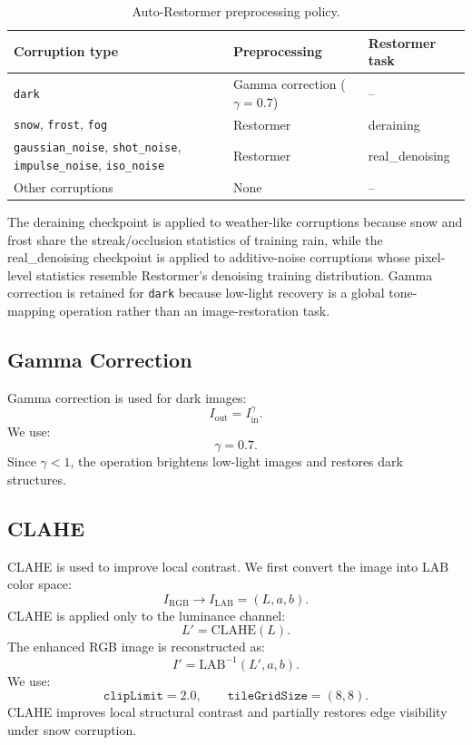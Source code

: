 \documentclass[10pt]{article}
\begin{document}
\begin{table}[H]
\centering
\begin{tabular}{lll}
\toprule
Corruption type & Preprocessing & Restormer task \\
\midrule
\texttt{dark} & Gamma correction ($\gamma=0.7$) & -- \\
\texttt{snow}, \texttt{frost}, \texttt{fog} & Restormer & deraining \\
\texttt{gaussian\_noise}, \texttt{shot\_noise}, \texttt{impulse\_noise}, \texttt{iso\_noise} & Restormer & real\_denoising \\
Other corruptions & None & -- \\
\bottomrule
\end{tabular}
\caption{Auto-Restormer preprocessing policy.}
\label{tab:auto-restormer-policy}
\end{table}

The deraining checkpoint is applied to weather-like corruptions because snow and frost share the streak/occlusion statistics of training rain, while the real\_denoising checkpoint is applied to additive-noise corruptions whose pixel-level statistics resemble Restormer's denoising training distribution. Gamma correction is retained for \texttt{dark} because low-light recovery is a global tone-mapping operation rather than an image-restoration task.

\subsection{Gamma Correction}

Gamma correction is used for dark images:
\[
I_{\text{out}} = I_{\text{in}}^\gamma.
\]
We use:
\[
\gamma = 0.7.
\]
Since $\gamma < 1$, the operation brightens low-light images and restores dark structures.

\subsection{CLAHE}

CLAHE is used to improve local contrast. We first convert the image into LAB color space:
\[
I_{\text{RGB}} \rightarrow I_{\text{LAB}} = (L,a,b).
\]
CLAHE is applied only to the luminance channel:
\[
L' = \mathrm{CLAHE}(L).
\]
The enhanced RGB image is reconstructed as:
\[
I' = \mathrm{LAB}^{-1}(L',a,b).
\]
We use:
\[
\texttt{clipLimit}=2.0,
\qquad
\texttt{tileGridSize}=(8,8).
\]
CLAHE improves local structural contrast and partially restores edge visibility under snow corruption.
\end{document}
